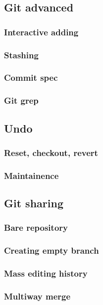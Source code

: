
\subsection{Git advanced}

\begin{frame}
	\frametitle{Interactive adding}
\end{frame}

\begin{frame}
	\frametitle{Stashing}
\end{frame}

\begin{frame}
	\frametitle{Commit spec}
\end{frame}

\begin{frame}
	\frametitle{Git grep}
\end{frame}

\subsection{Undo}

\begin{frame}
	\frametitle{Reset, checkout, revert}
\end{frame}

\begin{frame}
	\frametitle{Maintainence}
\end{frame}

\subsection{Git sharing}

\begin{frame}
	\frametitle{Bare repository}
\end{frame}

\begin{frame}
	\frametitle{Creating empty branch}
\end{frame}

\begin{frame}
	\frametitle{Mass editing history}
\end{frame}

\begin{frame}
	\frametitle{Multiway merge}
\end{frame}

